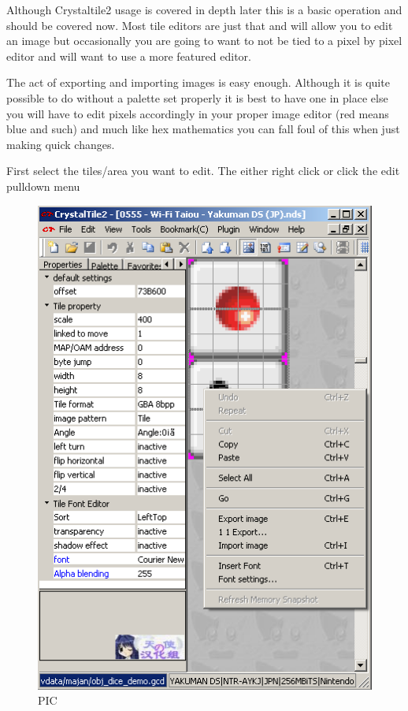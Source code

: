 \documentclass[
]{book}
\begin{document}
Although Crystaltile2 usage is covered in depth later this is a basic operation and should be covered now. Most tile editors are just that and will allow you to edit an image but occasionally you are going to want to not be tied to a pixel by pixel editor and will want to use a more featured editor.

The act of exporting and importing images is easy enough. Although it is quite possible to do without a palette set properly it is best to have one in place else you will have to edit pixels accordingly in your proper image editor (red means blue and such) and much like hex mathematics you can fall foul of this when just making quick changes.

First select the tiles/area you want to edit. The either right click or click the edit pulldown menu

\begin{figure}
\centering
\includegraphics{images/26_home_fast6191_romhackingguide_unrenamed_file____borders_romhackingguidecrystaltile2export1.png}
\caption{PIC}
\end{figure}
\end{document}
